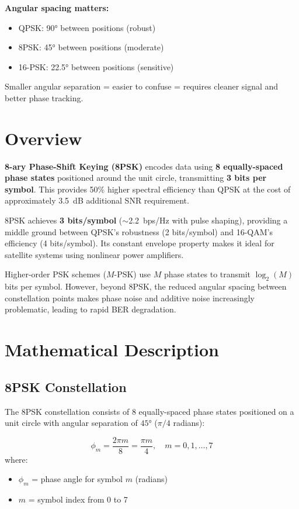 \begin{nontechnical}
\textbf{Angular spacing matters:}
\begin{itemize}
\item QPSK: 90° between positions (robust)
\item 8PSK: 45° between positions (moderate)
\item 16-PSK: 22.5° between positions (sensitive)
\end{itemize}
Smaller angular separation = easier to confuse = requires cleaner signal and better phase tracking.
\end{nontechnical}

\section{Overview}

\textbf{8-ary Phase-Shift Keying (8PSK)} encodes data using \textbf{8 equally-spaced phase states} positioned around the unit circle, transmitting \textbf{3 bits per symbol}. This provides 50\% higher spectral efficiency than QPSK at the cost of approximately 3.5~dB additional SNR requirement.

\begin{keyconcept}
8PSK achieves \textbf{3 bits/symbol} ($\sim$2.2~bps/Hz with pulse shaping), providing a middle ground between QPSK's robustness (2 bits/symbol) and 16-QAM's efficiency (4 bits/symbol). Its constant envelope property makes it ideal for satellite systems using nonlinear power amplifiers.
\end{keyconcept}

Higher-order PSK schemes ($M$-PSK) use $M$ phase states to transmit $\log_2(M)$ bits per symbol. However, beyond 8PSK, the reduced angular spacing between constellation points makes phase noise and additive noise increasingly problematic, leading to rapid BER degradation.

\section{Mathematical Description}

\subsection{8PSK Constellation}

The 8PSK constellation consists of 8 equally-spaced phase states positioned on a unit circle with angular separation of $45°$ ($\pi/4$ radians):

\begin{equation}
\phi_m = \frac{2\pi m}{8} = \frac{\pi m}{4}, \quad m = 0, 1, \ldots, 7
\end{equation}
where:
\begin{itemize}
\item $\phi_m$ = phase angle for symbol $m$ (radians)
\item $m$ = symbol index from 0 to 7
\end{itemize}

